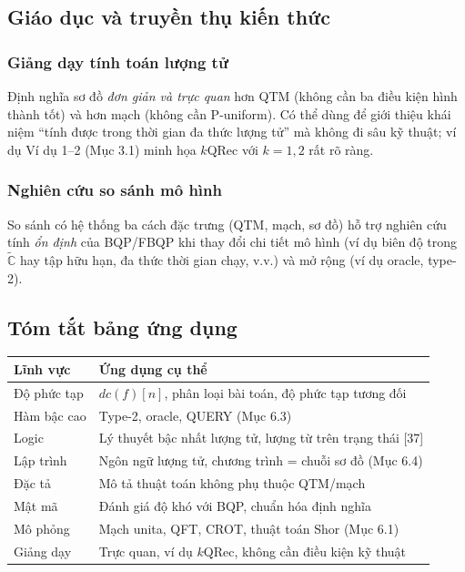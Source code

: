\documentclass[10pt]{article}
\begin{document}
\subsection*{Giáo dục và truyền thụ kiến thức}

\subsubsection*{Giảng dạy tính toán lượng tử}
Định nghĩa sơ đồ \emph{đơn giản và trực quan} hơn QTM (không cần ba điều kiện hình thành tốt) và hơn mạch (không cần P-uniform). Có thể dùng để giới thiệu khái niệm ``tính được trong thời gian đa thức lượng tử'' mà không đi sâu kỹ thuật; ví dụ Ví dụ 1--2 (Mục 3.1) minh họa $k$QRec với $k=1,2$ rất rõ ràng.

\subsubsection*{Nghiên cứu so sánh mô hình}
So sánh có hệ thống ba cách đặc trưng (QTM, mạch, sơ đồ) hỗ trợ nghiên cứu tính \emph{ổn định} của BQP/FBQP khi thay đổi chi tiết mô hình (ví dụ biên độ trong $\tilde{\mathbb{C}}$ hay tập hữu hạn, đa thức thời gian chạy, v.v.) và mở rộng (ví dụ oracle, type-2).

\subsection*{Tóm tắt bảng ứng dụng}
\begin{center}
\begin{tabular}{|l|l|}
\hline
\textbf{Lĩnh vực} & \textbf{Ứng dụng cụ thể} \\
\hline
Độ phức tạp & $dc(f)[n]$, phân loại bài toán, độ phức tạp tương đối \\
Hàm bậc cao & Type-2, oracle, QUERY (Mục 6.3) \\
Logic & Lý thuyết bậc nhất lượng tử, lượng từ trên trạng thái [37] \\
Lập trình & Ngôn ngữ lượng tử, chương trình = chuỗi sơ đồ (Mục 6.4) \\
Đặc tả & Mô tả thuật toán không phụ thuộc QTM/mạch \\
Mật mã & Đánh giá độ khó với BQP, chuẩn hóa định nghĩa \\
Mô phỏng & Mạch unita, QFT, CROT, thuật toán Shor (Mục 6.1) \\
Giảng dạy & Trực quan, ví dụ $k$QRec, không cần điều kiện kỹ thuật \\
\hline
\end{tabular}
\end{center}
\end{document}
